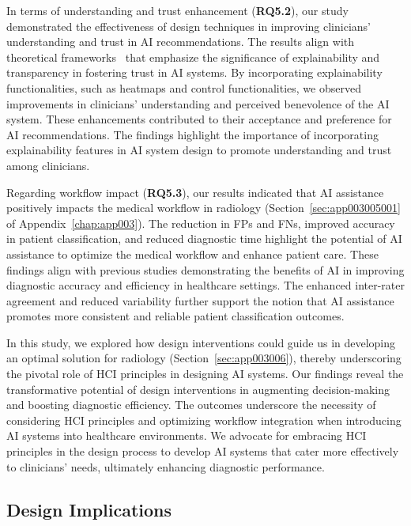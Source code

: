 In terms of understanding and trust enhancement ({\bf RQ5.2}), our study demonstrated the effectiveness of design techniques in improving clinicians' understanding and trust in \ac{AI} recommendations.
The results align with theoretical frameworks~\cite{10.1145/3311957.3361858} that emphasize the significance of explainability and transparency in fostering trust in \ac{AI} systems.
By incorporating explainability functionalities, such as heatmaps and control functionalities, we observed improvements in clinicians' understanding and perceived benevolence of the \ac{AI} system.
These enhancements contributed to their acceptance and preference for \ac{AI} recommendations.
The findings highlight the importance of incorporating explainability features in \ac{AI} system design to promote understanding and trust among clinicians.

Regarding workflow impact ({\bf RQ5.3}), our results indicated that \ac{AI} assistance positively impacts the medical workflow in radiology (Section~\ref{sec:app003005001} of Appendix~\ref{chap:app003}).
The reduction in \acp{FP} and \acp{FN}, improved accuracy in patient classification, and reduced diagnostic time highlight the potential of \ac{AI} assistance to optimize the medical workflow and enhance patient care.
These findings align with previous studies demonstrating the benefits of \ac{AI} in improving diagnostic accuracy and efficiency in healthcare settings.
The enhanced inter-rater agreement and reduced variability further support the notion that \ac{AI} assistance promotes more consistent and reliable patient classification outcomes.

In this study, we explored how design interventions could guide us in developing an optimal solution for radiology (Section~\ref{sec:app003006}), thereby underscoring the pivotal role of \ac{HCI} principles in designing \ac{AI} systems.
Our findings reveal the transformative potential of design interventions in augmenting decision-making and boosting diagnostic efficiency.
The outcomes underscore the necessity of considering \ac{HCI} principles and optimizing workflow integration when introducing \ac{AI} systems into healthcare environments.
We advocate for embracing \ac{HCI} principles in the design process to develop \ac{AI} systems that cater more effectively to clinicians' needs, ultimately enhancing diagnostic performance.

\subsection{Design Implications}
\label{sec:chap005007002}

